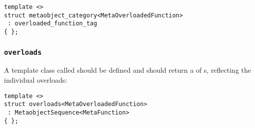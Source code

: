\begin{verbatim}
template <>
struct metaobject_category<MetaOverloadedFunction>
 : overloaded_function_tag
{ };
\end{verbatim}

\subsubsection{\texttt{overloads}}

A template class called \verb@overloads@ should be defined and should
return a  of s, reflecting
the individual overloads:

\begin{verbatim}
template <>
struct overloads<MetaOverloadedFunction>
 : MetaobjectSequence<MetaFunction>
{ };
\end{verbatim}

